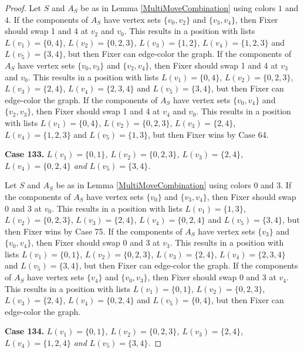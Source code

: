 \documentclass[12pt]{amsart}
\theoremstyle{plain}
\theoremstyle{definition}
\theoremstyle{remark}
\begin{document}
\begin{proof}
Let $S$ and $A_S$ be as in Lemma \ref{MultiMoveCombination} using colors $1$ and $4$. If the components of $A_S$ have vertex sets $\{v_0, v_2\}$ and $\{v_3, v_4\}$, then Fixer should swap 1 and 4 at $v_2$ and $v_0$. This results in a position with lists $L(v_1) = \{0, 4\}$, $L(v_2) = \{0, 2, 3\}$, $L(v_3) = \{1, 2\}$, $L(v_4) = \{1, 2, 3\}$ and $L(v_5) = \{3, 4\}$, but then Fixer can edge-color the graph.
If the components of $A_S$ have vertex sets $\{v_0, v_3\}$ and $\{v_2, v_4\}$, then Fixer should swap 1 and 4 at $v_3$ and $v_0$. This results in a position with lists $L(v_1) = \{0, 4\}$, $L(v_2) = \{0, 2, 3\}$, $L(v_3) = \{2, 4\}$, $L(v_4) = \{2, 3, 4\}$ and $L(v_5) = \{3, 4\}$, but then Fixer can edge-color the graph.
If the components of $A_S$ have vertex sets $\{v_0, v_4\}$ and $\{v_2, v_3\}$, then Fixer should swap 1 and 4 at $v_4$ and $v_0$. This results in a position with lists $L(v_1) = \{0, 4\}$, $L(v_2) = \{0, 2, 3\}$, $L(v_3) = \{2, 4\}$, $L(v_4) = \{1, 2, 3\}$ and $L(v_5) = \{1, 3\}$, but then Fixer wins by Case 64.

\noindent\textbf{Case 133.  }\textit{$L(v_1) = \{0, 1\}$, $L(v_2) = \{0, 2, 3\}$, $L(v_3) = \{2, 4\}$, $L(v_4) = \{0, 2, 4\}$ and $L(v_5) = \{3, 4\}$.}

Let $S$ and $A_S$ be as in Lemma \ref{MultiMoveCombination} using colors $0$ and $3$. If the components of $A_S$ have vertex sets $\{v_0\}$ and $\{v_3, v_4\}$, then Fixer should swap 0 and 3 at $v_0$. This results in a position with lists $L(v_1) = \{1, 3\}$, $L(v_2) = \{0, 2, 3\}$, $L(v_3) = \{2, 4\}$, $L(v_4) = \{0, 2, 4\}$ and $L(v_5) = \{3, 4\}$, but then Fixer wins by Case 75.
If the components of $A_S$ have vertex sets $\{v_3\}$ and $\{v_0, v_4\}$, then Fixer should swap 0 and 3 at $v_3$. This results in a position with lists $L(v_1) = \{0, 1\}$, $L(v_2) = \{0, 2, 3\}$, $L(v_3) = \{2, 4\}$, $L(v_4) = \{2, 3, 4\}$ and $L(v_5) = \{3, 4\}$, but then Fixer can edge-color the graph.
If the components of $A_S$ have vertex sets $\{v_4\}$ and $\{v_0, v_3\}$, then Fixer should swap 0 and 3 at $v_4$. This results in a position with lists $L(v_1) = \{0, 1\}$, $L(v_2) = \{0, 2, 3\}$, $L(v_3) = \{2, 4\}$, $L(v_4) = \{0, 2, 4\}$ and $L(v_5) = \{0, 4\}$, but then Fixer can edge-color the graph.

\noindent\textbf{Case 134.  }\textit{$L(v_1) = \{0, 1\}$, $L(v_2) = \{0, 2, 3\}$, $L(v_3) = \{2, 4\}$, $L(v_4) = \{1, 2, 4\}$ and $L(v_5) = \{3, 4\}$.}


\end{proof}
\end{document}
